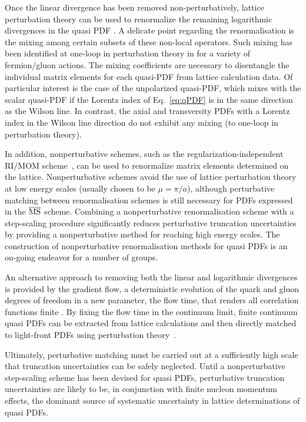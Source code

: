 Once the linear divergence has been removed non-perturbatively, lattice perturbation theory can be used to renormalize the remaining logarithmic divergences in the quasi PDF \cite{Ishikawa:2016znu, Carlson:2017gpk}. A delicate point regarding the renormalisation is the mixing among certain subsets of these non-local operators. Such mixing has been identified at one-loop in perturbation theory in \cite{Constantiou:2017soon} for a variety of fermion/gluon actions. The mixing coefficients are necessary to disentangle the individual matrix elements for each quasi-PDF from lattice calculation data. Of particular interest is the case of the unpolarized quasi-PDF, which mixes with the scalar quasi-PDF if the Lorentz index of Eq.~\eqref{eq:qPDF} is in the same direction as the Wilson line. In contrast, the axial and transversity PDFs with a Lorentz index in the Wilson line direction do not exhibit any mixing (to one-loop in perturbation theory). 

In addition, nonperturbative schemes, such as the regularization-independent RI/MOM scheme~\cite{Martinelli:1994ty}, can be used to renormalize matrix elements determined on the lattice. Nonperturbative schemes avoid the use of lattice perturbation theory at low energy scales (usually chosen to be $\mu = \pi/a$), although perturbative matching between renormalisation schemes is still necessary for PDFs expressed in the $\overline{\rm MS}$ scheme. Combining a nonperturbative renormalisation scheme with a step-scaling procedure \cite{Luscher:1991wu} significantly reduces perturbative truncation uncertainties by providing a nonperturbative method for reaching high energy scales. The construction of nonperturbative renormalisation methods for quasi PDFs is an on-going endeavor for a number of groups. 

An alternative approach to removing both the linear and logarithmic divergences is provided by the gradient flow, a deterministic evolution of the quark and gluon degrees of freedom in a new parameter, the flow time, that renders all correlation functions finite \cite{Narayanan:2006rf,Luscher:2011bx,Luscher:2013cpa}. By fixing the flow time in the continuum limit, finite continuum quasi PDFs can be extracted from lattice calculations and then directly matched to light-front PDFs using perturbation theory~\cite{Monahan:2016bvm}.

Ultimately, perturbative matching must be carried out at a sufficiently high scale that truncation uncertainties can be safely neglected. Until a nonperturbative step-scaling scheme has been devised for quasi PDFs, perturbative truncation uncertainties are likely to be, in conjunction with finite nucleon momentum effects, the dominant source of systematic uncertainty in lattice determinations of quasi PDFs.



